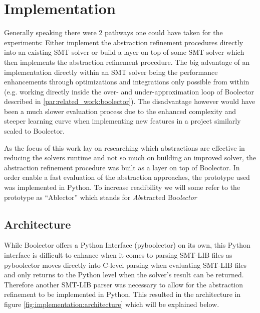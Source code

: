\chapter{Implementation}
\label{ch:implementation}

Generally speaking there were 2 pathways one could have taken for the experiments:
Either implement the abstraction refinement procedures directly into an existing SMT solver or build a layer on top of some SMT solver which then implements the abstraction refinement procedure.
The big advantage of an implementation directly within an SMT solver being the performance enhancements through optimizations and integrations only possible from within
(e.g. working directly inside the over- and under-approximation loop of Boolector described in \ref{par:related_work:boolector}).
The disadvantage however would have been a much slower evaluation process due to the enhanced complexity and steeper learning curve when implementing new features
in a project similarly scaled to Boolector.
\par
As the focus of this work lay on researching which abstractions are effective in reducing the solvers runtime and not so much on building an improved solver,
the abstraction refinement procedure was built as a layer on top of Boolector.
In order enable a fast evaluation of the abstraction approaches, the prototype used was implemented in Python.
To increase readibility we will some refer to the prototype as \enquote{Ablector} which stands for \textit{Ab}stracted Boo\textit{lector}

\section{Architecture}
While Boolector offers a Python Interface (pyboolector) on its own, this Python interface is difficult to enhance when it comes to parsing SMT-LIB files
as pyboolector moves directly into C-level parsing when evaluating SMT-LIB files and only returns to the Python level when the solver's result can be returned.
Therefore another SMT-LIB parser was necessary to allow for the abstraction refinement to be implemented in Python.
This resulted in the architecture in figure \ref{fig:implementation:architecture} which will be explained below.

